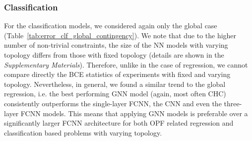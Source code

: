 \documentclass[journal]{IEEEtran}
\begin{document}
\subsubsection{Classification}
For the classification models, we considered again only the global case (Table~\ref{tab:error_clf_global_contingency}). We note that due to the higher number of non-trivial constraints, the size of the NN models with varying topology differs from those with fixed topology (details are shown in the \textit{Supplementary Materials}). Therefore, unlike in the case of regression, we cannot compare directly the BCE statistics of experiments with fixed and varying topology.  
Nevertheless, in general, we found a similar trend to the global regression, i.e. the best performing GNN model (again, most often CHC) consistently outperforms the single-layer FCNN, the CNN and even the three-layer FCNN models. This means that applying GNN models is preferable over a significantly larger FCNN architecture for both OPF related regression and classification based problems with varying topology.
\end{document}
